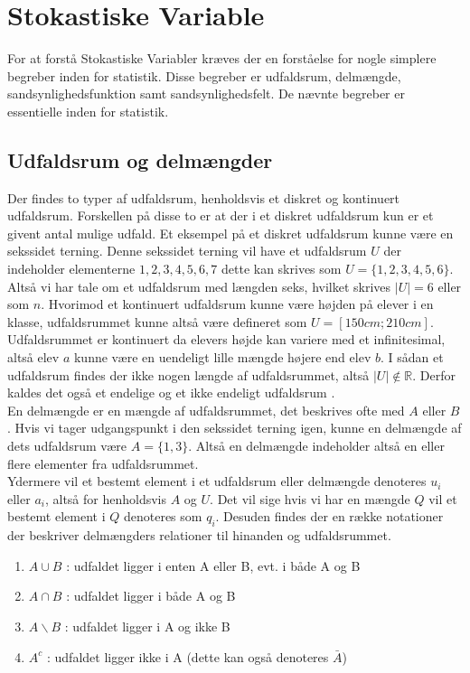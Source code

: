 \documentclass[../../SRP.tex]{subfiles}
\begin{document}
\chapter{Stokastiske Variable}

For at forstå Stokastiske Variabler kræves der en forståelse for nogle simplere begreber inden for statistik. Disse begreber er udfaldsrum, delmængde, sandsynlighedsfunktion samt sandsynlighedsfelt. De nævnte begreber er essentielle inden for statistik.

\section{Udfaldsrum og delmængder}

Der findes to typer af udfaldsrum, henholdsvis et diskret og kontinuert udfaldsrum. Forskellen på disse to er at der i et diskret udfaldsrum kun er et givent antal mulige udfald. Et eksempel på et diskret udfaldsrum kunne være en sekssidet terning. Denne sekssidet terning vil have et udfaldsrum $U$ der indeholder elementerne $1,2,3,4,5,6,7$ dette kan skrives som $U = \{1,2,3,4,5,6\}$. Altså vi har tale om et udfaldsrum med længden seks, hvilket skrives $|U| = 6$ eller som $n$. Hvorimod et kontinuert udfaldsrum kunne være højden på elever i en klasse, udfaldsrummet kunne altså være defineret som $U = [150cm;210cm]$. Udfaldsrummet er kontinuert da elevers højde kan variere med et infinitesimal, altså elev $a$ kunne være en uendeligt lille mængde højere end elev $b$. I sådan et udfaldsrum findes der ikke nogen længde af udfaldsrummet, altså $|U| \notin \mathbb{R}$. Derfor kaldes det også et endelige og et ikke endeligt udfaldsrum \cite{SC}. \\

En delmængde er en mængde af udfaldsrummet, det beskrives ofte med $A$ eller $B$. Hvis vi tager udgangspunkt i den sekssidet terning igen, kunne en delmængde af dets udfaldsrum være $A = \{1,3\}$. Altså en delmængde indeholder altså en eller flere elementer fra udfaldsrummet. \\

Ydermere vil et bestemt element i et udfaldsrum eller delmængde denoteres $u_i$ eller $a_i$, altså for henholdsvis $A$ og $U$. Det vil sige hvis vi har en mængde $Q$ vil et bestemt element i $Q$ denoteres som $q_i$. Desuden findes der en række notationer der beskriver delmængders relationer til hinanden og udfaldsrummet.
\begin{enumerate}
  \item $A \cup B$ : udfaldet ligger i enten A eller B, evt. i både A og B
  \item $A \cap B$ : udfaldet ligger i både A og B
  \item $A \backslash B$ : udfaldet ligger i A og ikke B
  \item $A^c$ : udfaldet ligger ikke i A (dette kan også denoteres $\bar{A}$)
\end{enumerate}
\end{document}
